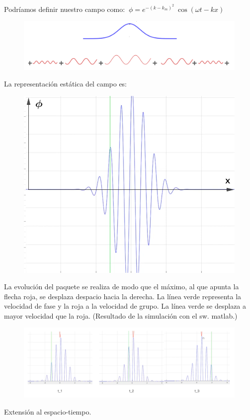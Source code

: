 Podríamos definir nuestro campo como: $\ \phi=e^{-(k-k_m)^2} \ \cos(\omega  t - k x)$

\begin{figure}[H]
	\centering
	\includegraphics[width=.75\textwidth]{imagenes/img33-08.png}
\end{figure}

La representación estática del campo es:


\begin{figure}[H]
	\centering
	\includegraphics[width=.5\textwidth]{imagenes/img33-05.png}
\end{figure}

La evolución del paquete se realiza de modo que el máximo, al que apunta la flecha roja, se desplaza despacio hacia la derecha. La línea verde representa la velocidad de fase y la roja a la velocidad de grupo. La línea verde se desplaza a mayor velocidad que la roja. \textcolor{gris}{(Resultado de la simulación con el sw. matlab.)}

\begin{figure}[H]
	\centering
	\includegraphics[width=.95\textwidth]{imagenes/img33-06.png}
\end{figure}

Extensión al espacio-tiempo.


